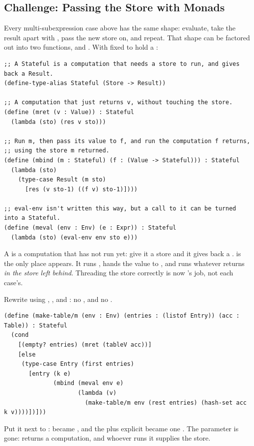\subsection{Challenge: Passing the Store with Monads}

Every multi-subexpression case above has the same shape: evaluate, take the result apart with , pass the new store on, and repeat. That shape can be factored out into two functions,  and . With  fixed to hold a :
\begin{lstlisting}
;; A Stateful is a computation that needs a store to run, and gives back a Result.
(define-type-alias Stateful (Store -> Result))

;; A computation that just returns v, without touching the store.
(define (mret (v : Value)) : Stateful
  (lambda (sto) (res v sto)))

;; Run m, then pass its value to f, and run the computation f returns,
;; using the store m returned.
(define (mbind (m : Stateful) (f : (Value -> Stateful))) : Stateful
  (lambda (sto)
    (type-case Result (m sto)
      [res (v sto-1) ((f v) sto-1)])))

;; eval-env isn't written this way, but a call to it can be turned into a Stateful.
(define (meval (env : Env) (e : Expr)) : Stateful
  (lambda (sto) (eval-env env sto e)))
\end{lstlisting}
A  is a computation that has not run yet: give it a store and it gives back a .  is the only place  appears. It runs , hands the value to , and runs whatever  returns \emph{in the store  left behind}. Threading the store correctly is now 's job, not each case's.

\begin{exercise}
Rewrite  using , , and : no , and no .
\end{exercise}
\begin{solution}
\begin{lstlisting}
(define (make-table/m (env : Env) (entries : (listof Entry)) (acc : Table)) : Stateful
  (cond
    [(empty? entries) (mret (tableV acc))]
    [else
     (type-case Entry (first entries)
       [entry (k e)
              (mbind (meval env e)
                     (lambda (v)
                       (make-table/m env (rest entries) (hash-set acc k v))))])]))
\end{lstlisting}
Put it next to :  became , and the  plus explicit  became one . The parameter  is gone:  returns a computation, and whoever runs it supplies the store.
\end{solution}

